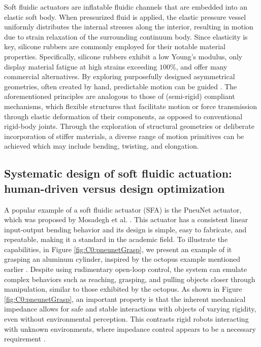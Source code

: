 Soft fluidic actuators are inflatable fluidic channels that are embedded into an elastic soft body. When pressurized fluid is applied, the elastic pressure vessel uniformly distributes the internal stresses along the interior, resulting in motion due to strain relaxation of the surrounding continuum body. Since elasticity is key, silicone rubbers are commonly employed for their notable material properties. Specifically, silicone rubbers exhibit a low Young's modulus, only display material fatigue at high strains exceeding $100\%$, and offer many commercial alternatives. By exploring purposefully designed asymmetrical geometries, often created by hand, predictable motion can be guided \cite{Xavier2022Jun,Rus2015,Hughes2016Nov}. The aforementioned principles are analogous to those of (semi-rigid) compliant mechanisms, which flexible structures that facilitate motion or force transmission through elastic deformation of their components, as opposed to conventional rigid-body joints. Through the exploration of structural geometries or deliberate incorporation of stiffer materials, a diverse range of motion primitives can be achieved which may include bending, twisting, and elongation.

\subsection[Human-driven design versus design optimization]{Systematic design of soft fluidic actuation: human-driven versus design optimization}
A popular example of a soft fluidic actuator (SFA) is the PneuNet actuator, which was proposed by Mosadegh et al. \cite{Mosadegh2014}. This actuator has a consistent linear input-output bending behavior and its design is simple, easy to fabricate, and repeatable, making it a standard in the academic field. To illustrate the capabilities, in Figure \ref{fig:C0:pneunetGrasp}, we present an example of it grasping an aluminum cylinder, inspired by the octopus example mentioned earlier \cite{Sumbre2001Sep}. Despite using rudimentary open-loop control, the system can emulate complex behaviors such as reaching, grasping, and pulling objects closer through manipulation, similar to those exhibited by the octopus. As shown in Figure \ref{fig:C0:pneunetGrasp}, an important property is that the inherent mechanical impedance allows for safe and stable interactions with objects of varying rigidity, even without environmental perception. This contrasts rigid robots interacting with unknown environments, where impedance control appears to be a necessary requirement \cite{Murray1994,DeLuca2016Jul}.

